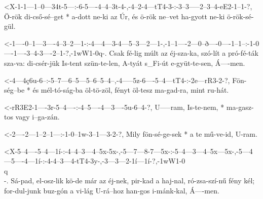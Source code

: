 

  {<X-1-1---1--0---34t-5---:-6-5----4--4--3t-4-,-4--2-4---tT4-3-:-3--3-----2--3--4-eE2-1--1-?,}
  {   Ö-rök di-cső-sé--get * a-dott ne-ki az Úr, és ö-rök ne--vet ha-gyott ne-ki ö-rök-sé-gül.}


  {<-1----0--1---3----4--3--2---1-:-4---4---3-4---5--3---2---1-,-1--1----2---0--ð----0----1--1--:-1-0----1----3--4-3----2--1-?,-1wW1-0q-.}
  {  Csak fé-lig múlt az éj-sza-ka, szó-lít a pró-fé-ták sza-va: di-csér-jük Is-tent szün-te-len, A-tyát s_Fi-út e-gyüt-te-sen, Á----men.}


  {<-4---4ç6u-6--:-5--7---6--5---5--6--5--4--,-4-----5z-6----5--4---tT4-:-2e---rR3-2-?,}
  {  Fön-ség--be * és mél-tó-ság-ba öl-tö-zöl, fényt öl-tesz ma-gad-ra,   mint ru-hát.}

  {<-rR3E2-1----3r-5--4----:-4--5----4---3----5u-6--4-?,}
  {  U-----ram, Is-te-nem, * ma-gasz-tos vagy i--ga-zán.}

  {<-2----2---1--2--1---:-1-0--1w-3--1---3-2-?,}
  {  Mily fön-sé-ge-sek * a te mű-ve-id, U-ram.}


  {<X-5--4----5--4---1í-:-4--4--3---4--5x-5x-,-5---7---8-7---5x-:-5--4---3---4--5x---5x-,-5---4---5----4---1í-:-4-4--3---4-tT4-3y-,-3---3---2-1í---1í-?,-1wW1-0\\q\\-.}
  {   Sá-pad, el-osz-lik  kö-de már az éj-nek, pir-kad a haj-nal, ró-zsa-szí-nű fény kél; for-dul-junk buz-gón  a vi-lág U-rá--hoz  han-gos i-mánk-kal,  Á----men.}

